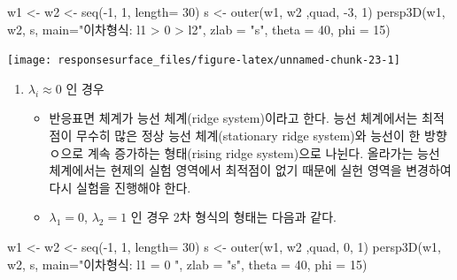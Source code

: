 \documentclass[
]{book}
\newenvironment{Shaded}{\begin{snugshade}}{\end{snugshade}}
\newcommand{\AttributeTok}[1]{\textcolor[rgb]{0.77,0.63,0.00}{#1}}
\newcommand{\DecValTok}[1]{\textcolor[rgb]{0.00,0.00,0.81}{#1}}
\newcommand{\FunctionTok}[1]{\textcolor[rgb]{0.00,0.00,0.00}{#1}}
\newcommand{\NormalTok}[1]{#1}
\newcommand{\OtherTok}[1]{\textcolor[rgb]{0.56,0.35,0.01}{#1}}
\newcommand{\SpecialCharTok}[1]{\textcolor[rgb]{0.00,0.00,0.00}{#1}}
\newcommand{\StringTok}[1]{\textcolor[rgb]{0.31,0.60,0.02}{#1}}
\theoremstyle{definition}
\theoremstyle{definition}
\theoremstyle{definition}
\theoremstyle{definition}
\theoremstyle{remark}
\begin{document}
\begin{Shaded}
\begin{Highlighting}[]
\NormalTok{w1 }\OtherTok{\textless{}{-}}\NormalTok{ w2 }\OtherTok{\textless{}{-}} \FunctionTok{seq}\NormalTok{(}\SpecialCharTok{{-}}\DecValTok{1}\NormalTok{, }\DecValTok{1}\NormalTok{, }\AttributeTok{length=} \DecValTok{30}\NormalTok{)}
\NormalTok{s }\OtherTok{\textless{}{-}} \FunctionTok{outer}\NormalTok{(w1, w2 ,quad, }\SpecialCharTok{{-}}\DecValTok{3}\NormalTok{, }\DecValTok{1}\NormalTok{)}
\FunctionTok{persp3D}\NormalTok{(w1, w2, s,}
      \AttributeTok{main=}\StringTok{"이차형식: l1 \textgreater{}  0  \textgreater{} l2"}\NormalTok{,}
      \AttributeTok{zlab =} \StringTok{"s"}\NormalTok{,}
      \AttributeTok{theta =} \DecValTok{40}\NormalTok{, }\AttributeTok{phi =} \DecValTok{15}\NormalTok{)}
\end{Highlighting}
\end{Shaded}

\begin{center}\texttt{[image: responsesurface\_files/figure-latex/unnamed-chunk-23-1]} \end{center}

\begin{enumerate}
\def\labelenumi{\arabic{enumi}.}
\setcounter{enumi}{3}
\item
  \(\lambda_i \approx 0\) 인 경우

  \begin{itemize}
  \item
    반응표면 체계가 능선 체계(ridge system)이라고 한다. 능선 체계에서는 최적점이 무수히 많은 정상 능선 체계(stationary ridge system)와 능선이 한 방향ㅇ으로 계속 증가하는 형태(rising ridge system)으로 나뉜다. 올라가는 능선 체계에서는 현제의 실험 영역에서 최적점이 없기 때문에 실헌 영역을 변경하여 다시 실험을 진행해야 한다.
  \item
    \(\lambda_1 = 0\), \(\lambda_2 =1\) 인 경우 2차 형식의 형태는 다음과 같다.
  \end{itemize}
\end{enumerate}

\begin{Shaded}
\begin{Highlighting}[]
\NormalTok{w1 }\OtherTok{\textless{}{-}}\NormalTok{ w2 }\OtherTok{\textless{}{-}} \FunctionTok{seq}\NormalTok{(}\SpecialCharTok{{-}}\DecValTok{1}\NormalTok{, }\DecValTok{1}\NormalTok{, }\AttributeTok{length=} \DecValTok{30}\NormalTok{)}
\NormalTok{s }\OtherTok{\textless{}{-}} \FunctionTok{outer}\NormalTok{(w1, w2 ,quad, }\DecValTok{0}\NormalTok{, }\DecValTok{1}\NormalTok{)}
\FunctionTok{persp3D}\NormalTok{(w1, w2, s,}
      \AttributeTok{main=}\StringTok{"이차형식: l1 =  0 "}\NormalTok{,}
      \AttributeTok{zlab =} \StringTok{"s"}\NormalTok{,}
      \AttributeTok{theta =} \DecValTok{40}\NormalTok{, }\AttributeTok{phi =} \DecValTok{15}\NormalTok{)}
\end{Highlighting}
\end{Shaded}
\end{document}

